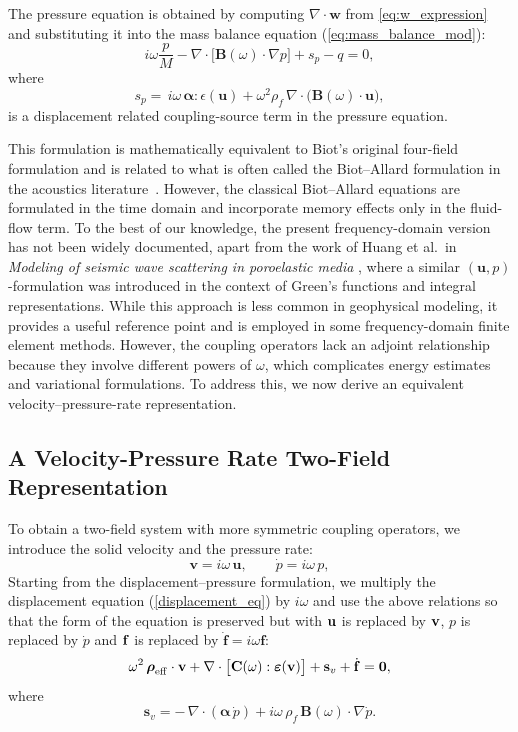 \documentclass[pdflatex,sn-mathphys-num]{sn-jnl}
\theoremstyle{thmstyleone}%
\theoremstyle{thmstyletwo}%
\theoremstyle{thmstylethree}%
\theoremstyle{definition}
\begin{document}
	
	The pressure equation is obtained by computing \( \nabla\cdot\mathbf{w} \) from \eqref{eq:w_expression} and substituting it into the mass balance equation (\ref{eq:mass_balance_mod}):
	\begin{equation}
		i\omega \frac{p}{M} - \nabla\cdot\big[\mathbf{B}(\omega)\cdot\nabla p\big] + s_p - q = 0,
		\label{pressure_eq}
	\end{equation}
	where
	\[
	s_p = \,i\omega\,\boldsymbol{\alpha}:\epsilon(\mathbf{u}) +\omega^2\rho_f\,\nabla\cdot\big(\mathbf{B}(\omega)\cdot\mathbf{u}\big),
	\]
	is a displacement related coupling-source term in the pressure equation.
	
	This formulation is mathematically equivalent to Biot’s original four-field formulation and is related to what is often called the Biot--Allard formulation in the acoustics literature~\cite{Allard1993, Mikelic2012}. However, the classical Biot--Allard equations are formulated in the time domain and incorporate memory effects only in the fluid-flow term. To the best of our knowledge, the present frequency-domain version has not been widely documented, apart from the work of Huang et al.\ in \emph{Modeling of seismic wave scattering in poroelastic media} \cite{Huang2024}, where a similar \( (\mathbf{u},p) \)-formulation was introduced in the context of Green’s functions and integral representations. While this approach is less common in geophysical modeling, it provides a useful reference point and is employed in some frequency-domain finite element methods. However, the coupling operators lack an adjoint relationship because they involve different powers of \( \omega \), which complicates energy estimates and variational formulations. To address this, we now derive an equivalent velocity--pressure-rate representation.
	
	
	
	
	
	\subsection{A Velocity-Pressure Rate Two-Field Representation}
	
	To obtain a two-field system with more symmetric coupling operators, we introduce the solid velocity and the pressure rate:
	\[
	\mathbf{v} = i\omega\,\mathbf{u}, 
	\qquad 
	\dot{p} = i\omega\,p,
	\]
	Starting from the displacement--pressure formulation, we multiply the displacement equation (\ref{displacement_eq}) by \( i\omega \) and use the above relations so that the form of the equation is preserved but with ${\bf u}$ is replaced by ${\bf v}$, $p$ is replaced by $\dot{p}$ and ${\bf f}$ is replaced by $\dot{\mathbf{f}} = i\omega \mathbf{f}$:
	\begin{equation}
		\omega^2\,\boldsymbol{\rho}_{\mathrm{eff}}\cdot\mathbf{v} + \nabla\cdot\big[\mathbf{C}(\omega):\boldsymbol{\varepsilon}(\mathbf{v})\big] +  \mathbf{s}_v + \dot{\mathbf{f}} = {\bf 0},
		\label{eq:vpr_velocity}
	\end{equation}
	where
	\begin{equation*}
		\mathbf{s}_v = -\,\nabla\cdot(\boldsymbol{\alpha}\,\dot{p}) + i\omega\,\rho_f\,\mathbf{B}(\omega)\cdot\nabla\dot{p}.
	\end{equation*}
	
\end{document}
